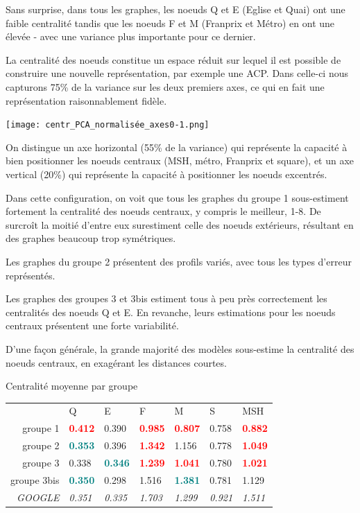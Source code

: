 \documentclass[a4paper]{article}
\begin{document}
Sans surprise, dans tous les graphes, les noeuds Q et E (Eglise et Quai) ont une faible centralité tandis que les noeuds F et M (Franprix et Métro) en ont une élevée - avec une variance plus importante pour ce dernier.

La centralité des noeuds constitue un espace réduit sur lequel il est possible de construire une nouvelle représentation, par exemple une ACP. Dans celle-ci nous capturons 75\% de la variance sur les deux premiers axes, ce qui en fait une représentation raisonnablement fidèle.

\texttt{[image: centr\_PCA\_normalisée\_axes0-1.png]}

On distingue un axe horizontal (55\% de la variance) qui représente la capacité à bien positionner les noeuds centraux (MSH, métro, Franprix et square), et un axe vertical (20\%) qui représente la capacité à positionner les noeuds excentrés.

Dans cette configuration, on voit que tous les graphes du groupe 1 sous-estiment fortement la centralité des noeuds centraux, y compris le meilleur, 1-8. De surcroît la moitié d'entre eux surestiment celle des noeuds extérieurs, résultant en des graphes beaucoup trop symétriques.

Les graphes du groupe 2 présentent des profils variés, avec tous les types d'erreur représentés.

Les graphes des groupes 3 et 3bis estiment tous à peu près correctement les centralités des noeuds Q et E. En revanche, leurs estimations pour les noeuds centraux présentent une forte variabilité.

D'une façon générale, la grande majorité des modèles sous-estime la centralité des noeuds centraux, en exagérant les distances courtes.


\begin{center}
Centralité moyenne par groupe\\
\begin{tabular}{rllllll}
& Q & E & F & M & S & MSH\\
groupe 1 & \textcolor{red}{\textbf{0.412}} & 0.390 & \textcolor{red}{\textbf{0.985}} & \textcolor{red}{\textbf{0.807}} & 0.758 & \textcolor{red}{\textbf{0.882}}\\
groupe 2 & \textcolor{teal}{\textbf{0.353}} & 0.396 & \textcolor{red}{\textbf{1.342}} & 1.156 & 0.778 & \textcolor{red}{\textbf{1.049}}\\
groupe 3 & 0.338 & \textcolor{teal}{\textbf{0.346}} & \textcolor{red}{\textbf{1.239}} & \textcolor{red}{\textbf{1.041}} & 0.780 & \textcolor{red}{\textbf{1.021}}\\
groupe 3bis & \textcolor{teal}{\textbf{0.350}} & 0.298 & 1.516 & \textcolor{teal}{\textbf{1.381}} & 0.781 & 1.129\\
\textit{GOOGLE} & \textit{0.351} & \textit{0.335} & \textit{1.703} & \textit{1.299} & \textit{0.921} & \textit{1.511}\\
\end{tabular}
\end{center}
\end{document}
